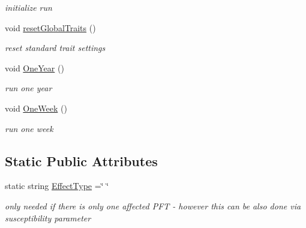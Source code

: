 \begin{DoxyCompactItemize}
\begin{DoxyCompactList}\small\item\em initialize run \end{DoxyCompactList}\item 
\mbox{\label{class_c_herbicide_effect_env_a1e9b8f090c78342e9e8314c95fcca8ba}} 
void \mbox{\hyperlink{class_c_herbicide_effect_env_a1e9b8f090c78342e9e8314c95fcca8ba}{reset\+Global\+Traits}} ()
\begin{DoxyCompactList}\small\item\em reset standard trait settings \end{DoxyCompactList}\item 
void \mbox{\hyperlink{class_c_herbicide_effect_env_ac62e9a406dcb24c30798bff6a369282b}{One\+Year}} ()
\begin{DoxyCompactList}\small\item\em run one year \end{DoxyCompactList}\item 
void \mbox{\hyperlink{class_c_herbicide_effect_env_a82fba7cb44890dd47d5e594f72803241}{One\+Week}} ()
\begin{DoxyCompactList}\small\item\em run one week \end{DoxyCompactList}\end{DoxyCompactItemize}
\subsection*{Static Public Attributes}
\begin{DoxyCompactItemize}
\item 
\mbox{\label{class_c_herbicide_effect_env_aa9c583edf2b6c9d2d5c45bd9c96258a8}} 
static string \mbox{\hyperlink{class_c_herbicide_effect_env_aa9c583edf2b6c9d2d5c45bd9c96258a8}{Effect\+Type}} =\char`\"{} \char`\"{}
\begin{DoxyCompactList}\small\item\em only needed if there is only one affected P\+FT -\/ however this can be also done via susceptibility parameter \end{DoxyCompactList}\end{DoxyCompactItemize}
